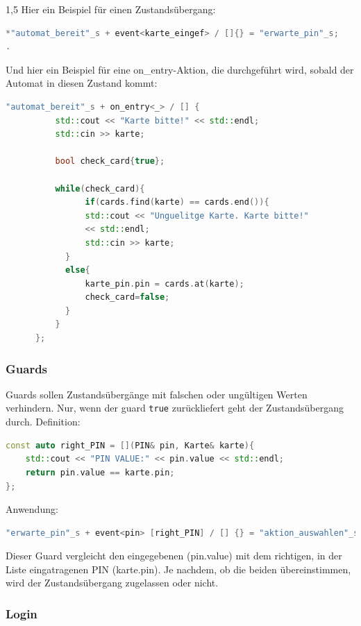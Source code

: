 \documentclass[a4paper]{article}
\begin{document}
\begin{spacing}{1,5}
Hier ein Beispiel für einen Zustandsübergang:

\begin{lstlisting}[language=c++]
*"automat_bereit"_s + event<karte_eingef> / []{} = "erwarte_pin"_s;
.
\end{lstlisting}
Und hier ein Beispiel für eine on\_entry-Aktion, die durchgeführt wird, sobald der Automat in diesen Zustand kommt:
\begin{lstlisting}[language=c++]
"automat_bereit"_s + on_entry<_> / [] {
          std::cout << "Karte bitte!" << std::endl;
          std::cin >> karte;

          bool check_card{true};

          while(check_card){
                if(cards.find(karte) == cards.end()){
                std::cout << "Unguelitge Karte. Karte bitte!"
                << std::endl;
                std::cin >> karte;
            }
            else{
                karte_pin.pin = cards.at(karte);
                check_card=false;
            }
          }      
      };
\end{lstlisting}

\subsubsection{Guards}

Guards sollen Zustandsübergänge mit falschen oder ungültigen Werten verhindern. Nur, wenn der guard \texttt{true} zurückliefert geht der Zustandsübergang durch.\newline\newline
Definition:
\begin{lstlisting}[language=c++]
const auto right_PIN = [](PIN& pin, Karte& karte){
    std::cout << "PIN VALUE:" << pin.value << std::endl;
    return pin.value == karte.pin;
};
\end{lstlisting}
Anwendung:

\begin{lstlisting}[language=c++]
"erwarte_pin"_s + event<pin> [right_PIN] / [] {} = "aktion_auswahlen"_s;
\end{lstlisting}
Dieser Guard vergleicht den eingegebenen (pin.value)
 mit dem richtigen, in der Liste eingatragenen PIN (karte.pin). Je nachdem, ob die beiden übereinstimmen, wird der Zustandsübergang zugelassen oder nicht.

\subsubsection{Login}


\end{spacing}
\end{document}
